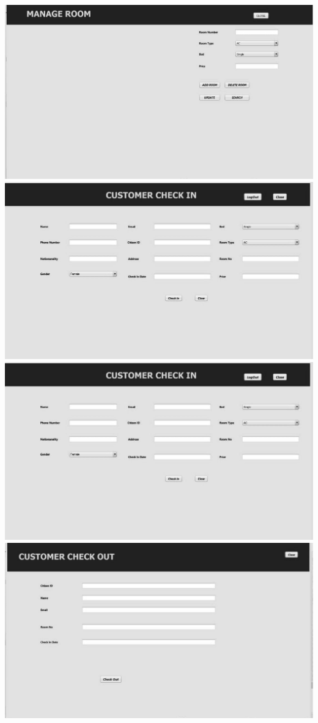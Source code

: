 \documentclass[a4paper,12pt]{report}
\begin{document}
\includegraphics[scale=0.3]{wf5.jpg}
\includegraphics[scale=0.3]{wf6.jpg}
\includegraphics[scale=0.3]{wf7.jpg}
\includegraphics[scale=0.3]{wf8.jpg}
\end{document}
